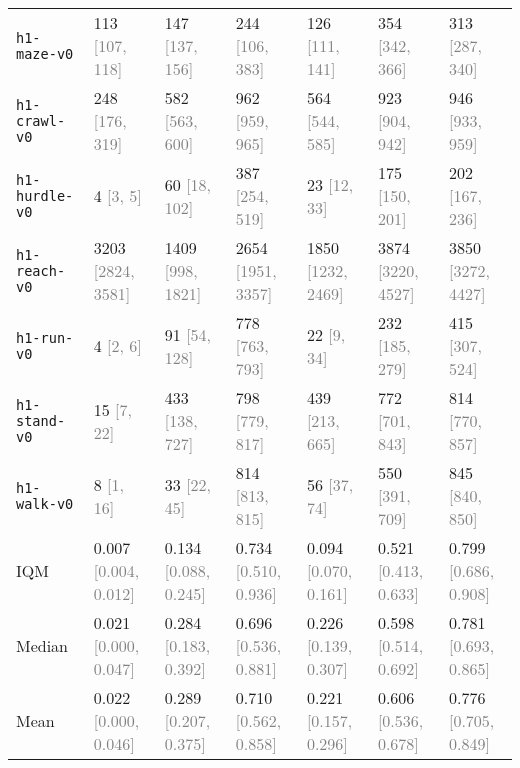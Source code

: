 \begin{table}[h]
{{\begin{tabular}{lllllll}
\texttt{h1-maze-v0} & 113 \textcolor{gray}{[107, 118]} & 147 \textcolor{gray}{[137, 156]} & 244 \textcolor{gray}{[106, 383]} & 126 \textcolor{gray}{[111, 141]} & 354 \textcolor{gray}{[342, 366]} & 313 \textcolor{gray}{[287, 340]} \\
\texttt{h1-crawl-v0} & 248 \textcolor{gray}{[176, 319]} & 582 \textcolor{gray}{[563, 600]} & 962 \textcolor{gray}{[959, 965]} & 564 \textcolor{gray}{[544, 585]} & 923 \textcolor{gray}{[904, 942]} & 946 \textcolor{gray}{[933, 959]} \\
\texttt{h1-hurdle-v0} & 4 \textcolor{gray}{[3, 5]} & 60 \textcolor{gray}{[18, 102]} & 387 \textcolor{gray}{[254, 519]} & 23 \textcolor{gray}{[12, 33]} & 175 \textcolor{gray}{[150, 201]} & 202 \textcolor{gray}{[167, 236]} \\
\texttt{h1-reach-v0} & 3203 \textcolor{gray}{[2824, 3581]} & 1409 \textcolor{gray}{[998, 1821]} & 2654 \textcolor{gray}{[1951, 3357]} & 1850 \textcolor{gray}{[1232, 2469]} & 3874 \textcolor{gray}{[3220, 4527]} & 3850 \textcolor{gray}{[3272, 4427]} \\
\texttt{h1-run-v0} & 4 \textcolor{gray}{[2, 6]} & 91 \textcolor{gray}{[54, 128]} & 778 \textcolor{gray}{[763, 793]} & 22 \textcolor{gray}{[9, 34]} & 232 \textcolor{gray}{[185, 279]} & 415 \textcolor{gray}{[307, 524]} \\
\texttt{h1-stand-v0} & 15 \textcolor{gray}{[7, 22]} & 433 \textcolor{gray}{[138, 727]} & 798 \textcolor{gray}{[779, 817]} & 439 \textcolor{gray}{[213, 665]} & 772 \textcolor{gray}{[701, 843]} & 814 \textcolor{gray}{[770, 857]} \\
\texttt{h1-walk-v0} & 8 \textcolor{gray}{[1, 16]} & 33 \textcolor{gray}{[22, 45]} & 814 \textcolor{gray}{[813, 815]} & 56 \textcolor{gray}{[37, 74]} & 550 \textcolor{gray}{[391, 709]} & 845 \textcolor{gray}{[840, 850]} \\ \midrule
IQM & 0.007 \textcolor{gray}{[0.004, 0.012]} & 0.134 \textcolor{gray}{[0.088, 0.245]} & 0.734 \textcolor{gray}{[0.510, 0.936]} & 0.094 \textcolor{gray}{[0.070, 0.161]} & 0.521 \textcolor{gray}{[0.413, 0.633]} & 0.799 \textcolor{gray}{[0.686, 0.908]} \\
Median & 0.021 \textcolor{gray}{[0.000, 0.047]} & 0.284 \textcolor{gray}{[0.183, 0.392]} & 0.696 \textcolor{gray}{[0.536, 0.881]} & 0.226 \textcolor{gray}{[0.139, 0.307]} & 0.598 \textcolor{gray}{[0.514, 0.692]} & 0.781 \textcolor{gray}{[0.693, 0.865]} \\
Mean & 0.022 \textcolor{gray}{[0.000, 0.046]} & 0.289 \textcolor{gray}{[0.207, 0.375]} & 0.710 \textcolor{gray}{[0.562, 0.858]} & 0.221 \textcolor{gray}{[0.157, 0.296]} & 0.606 \textcolor{gray}{[0.536, 0.678]} & 0.776 \textcolor{gray}{[0.705, 0.849]} \\
\bottomrule
\end{tabular}
}
}
\vspace{-0.1in}
\end{table}


